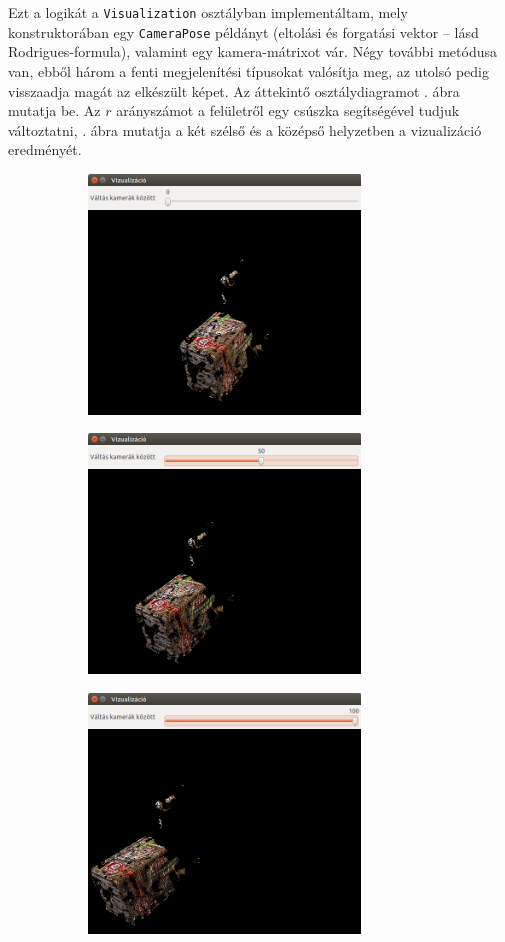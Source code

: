 Ezt a logikát a \texttt{Visualization} osztályban implementáltam, mely konstruktorában egy \texttt{CameraPose} példányt (eltolási és forgatási vektor -- lásd Rodrigues-formula), valamint egy kamera-mátrixot vár. Négy további metódusa van, ebből három a fenti megjelenítési típusokat valósítja meg, az utolsó pedig visszaadja magát az elkészült képet. Az áttekintő osztálydiagramot . ábra mutatja be. Az $r$ arányszámot a felületről egy csúszka segítségével tudjuk változtatni, . ábra mutatja a két szélső és a középső helyzetben a vizualizáció eredményét.

\begin{figure}[tbh]
\centering
\begin{subfigure}[b]{.49\linewidth}
	\centering
	\includegraphics[width=205pt]{figures/visu_pixels_left.png}
	\caption{}
  \end{subfigure}
\begin{subfigure}[b]{.49\linewidth}
	\centering
	\includegraphics[width=205pt]{figures/visu_pixels_center.png}
	\caption{}
  \end{subfigure}
\begin{subfigure}[b]{.49\linewidth}
	\centering
	\includegraphics[width=205pt]{figures/visu_pixels_right.png}

\end{subfigure}
\end{figure}
